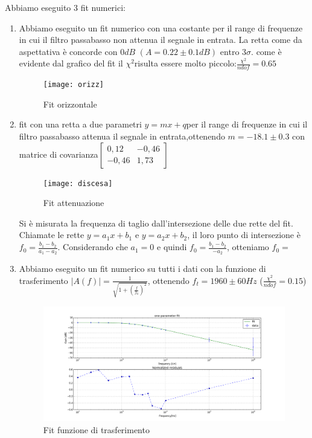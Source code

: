 \documentclass[10pt,a4paper]{article}
\begin{document}
Abbiamo eseguito 3 fit numerici:
\begin{enumerate}
	\item Abbiamo eseguito un fit numerico con una costante  per il range di frequenze in cui il filtro passabasso non attenua il segnale in entrata. La retta  come da aspettativa è concorde con $0 dB$ $(A=0.22\pm0.1 dB)$  entro $3\sigma$.
 come è evidente dal grafico del fit il $\chi^2 $risulta essere molto piccolo:$\frac{\chi^2}{ndof}=0.65$

\begin{figure}[!htb]
  \centering
  \texttt{[image: orizz]}
\caption{Fit orizzontale}
\end{figure}
  

\item  fit con una retta a due parametri $y=mx+q $per il range di frequenze  in cui il filtro passabasso attenua il segnale in entrata,ottenendo $m=-18.1\pm0.3$ con matrice di covarianza$ \left[\begin{matrix}0,12 &-0,46 \\ -0,46 & 1,73\end{matrix}\right]$



\begin{figure}[!htb]
  \centering
  \texttt{[image: discesa]}
\caption{Fit attenuazione}
\end{figure}
Si è misurata la frequenza di taglio dall'intersezione delle due rette del fit. Chiamate le rette $y = a_1 x+b_1$ e $y = a_2 x+b_2$, il loro punto di intersezione è $f_0 = \frac{b_1 - b_2}{a_1 - a_2}$.
Considerando che $a_1=0$ e quindi  $f_0 = \frac{b_1 - b_2}{- a_2}$, otteniamo $f_0 =$


\item Abbiamo eseguito un fit numerico su tutti i dati con la funzione di trasferimento  $\vert A(f) \vert = \frac{1}{\sqrt{1+(\frac{f}{f_{0}})^2}} $, ottenendo $f_t=1960 \pm 60 Hz$ ($\frac{\chi^2}{ndof}=0.15$)
\begin{figure}[!htb]
  \centering
  \includegraphics[scale=0.4]{fitcompleto}
\caption{Fit funzione di trasferimento}
\end{figure}
\end{enumerate}
\end{document}

